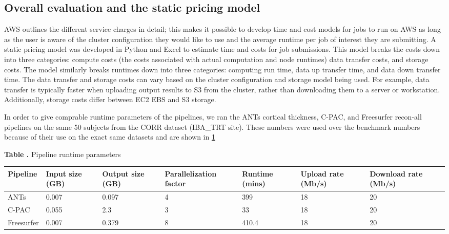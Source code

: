 \documentclass{frontiersSCNS} %
\begin{document}
\subsection{Overall evaluation and the static pricing model}

AWS outlines the different service charges in detail; this makes it possible to develop time and cost models for jobs to run on AWS as long as the user is aware of the cluster configuration they would like to use and the average runtime per job of interest they are submitting. A static pricing model was developed in Python and Excel to estimate time and costs for job submissions. This model breaks the costs down into three categories: compute costs (the costs associated with actual computation and node runtimes) data transfer costs, and storage costs. The model similarly breaks runtimes down into three categories: computing run time, data up transfer time, and data down transfer time. The data transfer and storage costs can vary based on the cluster configuration and storage model being used. For example, data transfer is typically faster when uploading output results to S3 from the cluster, rather than downloading them to a server or workstation. Additionally, storage costs differ between EC2 EBS and S3 storage.

In order to give comprable runtime parameters of the pipelines, we ran the ANTs cortical thickness, C-PAC, and Freesurfer recon-all pipelines on the same 50 subjects from the CORR dataset (IBA\_TRT site). These numbers were used over the benchmark numbers because of their use on the exact same datasets and are shown in \ref{tab:static_params}

\begin{table}[!ht]
\textbf{\label{tab:static_params} Table .}{ Pipeline runtime parameters}

\processtable{}
{\begin{tabular}{lllllll}\toprule
        Pipeline & Input size (GB) & Output size (GB) & Parallelization factor & Runtime (mins) & Upload rate (Mb/s) & Download rate (Mb/s)\\\midrule
        ANTs & 0.007 & 0.097 & 4 & 399 & 18 & 20\\
        C-PAC & 0.055 & 2.3 & 3 & 33 & 18 & 20\\
        Freesurfer & 0.007 & 0.379 & 8 & 410.4 & 18 & 20\\
\end{tabular}}{}
\end{table}
\end{document}
